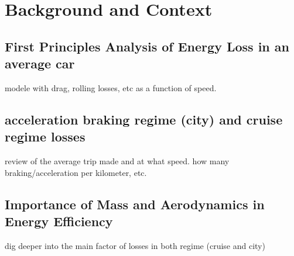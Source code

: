 \section{Background and Context}

\subsection{First Principles Analysis of Energy Loss in an average car}
modele with drag, rolling losses, etc as a function of speed.

\subsection{acceleration braking regime (city) and cruise regime losses}
review of the average trip made and at what speed. how many braking/acceleration per kilometer, etc.

\subsection{Importance of Mass and Aerodynamics in Energy Efficiency}
dig deeper into the main factor of losses in both regime (cruise and city)